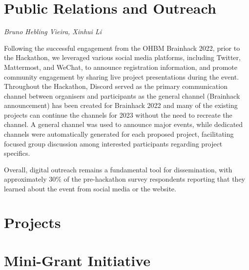 \documentclass{article}
\newcommand\coordinator[1]{\begin{flushleft}\small\textit{#1}\end{flushleft}}
\begin{document}
\section{Public Relations and Outreach}
\coordinator{Bruno Hebling Vieira, Xinhui Li}

Following the successful engagement from the OHBM Brainhack 2022, prior to the Hackathon, we leveraged various social media platforms, including Twitter, Mattermost, and WeChat, to announce registration information, and promote community engagement by sharing live project presentations during the event.
Throughout the Hackathon, Discord served as the primary communication channel between organisers and participants as the general channel (Brainhack announcement) has been created for Brainhack 2022 and many of the existing projects can continue the channels for 2023 without the need to recreate the channel.
A general channel was used to announce major events, while dedicated channels were automatically generated for each proposed project, facilitating focused group discussion among interested participants regarding project specifics.

Overall, digital outreach remains a fundamental tool for dissemination, with approximately 30\% of the pre-hackathon survey respondents reporting that they learned about the event from social media or the website.


\section{Projects}


\section{Mini-Grant Initiative}
\end{document}
